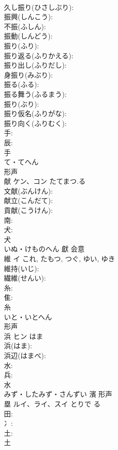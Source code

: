 \documentclass[8pt]{extreport}
\begin{document}
\begin{CJK}{UTF8}{min}
\\	久し振り(ひさしぶり): 
\\	振興(しんこう): 
\\	不振(ふしん): 
\\	振動(しんどう): 
\\	振り(ふり): 
\\	振り返る(ふりかえる): 
\\	振り出し(ふりだし): 
\\	身振り(みぶり): 
\\	振る(ふる): 
\\	振る舞う(ふるまう): 
\\	振り(ぶり): 
\\	振り仮名(ふりがな): 
\\	振り向く(ふりむく): 
\\	手: 
\\	辰: 
\\	手	
\\	て・てへん	
\\	形声 
\\	献	ケン、コン	たてまつ.る		
\\	文献(ぶんけん): 
\\	献立(こんだて): 
\\	貢献(こうけん): 
\\	南: 
\\	犬: 
\\	犬	
\\	いぬ・けものへん	獻	会意 
\\	維	イ		これ, たもつ, つぐ, ゆい, ゆき	
\\	維持(いじ): 
\\	繊維(せんい): 
\\	糸: 
\\	隹: 
\\	糸	
\\	いと・いとへん	
\\	形声 
\\	浜	ヒン	はま		
\\	浜(はま): 
\\	浜辺(はまべ): 
\\	水: 
\\	兵: 
\\	水	
\\	みず・したみず・さんずい	濱	形声 
\\	塁	ルイ、ライ、スイ	とりで	る	
\\	田: 
\\	冫: 
\\	土: 
\\	土	

\end{CJK}
\end{document}
